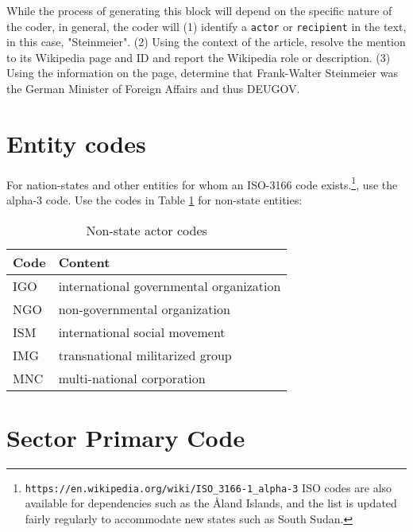\documentclass[11pt]{report}
\newcommand{\txt}[1]{\texttt{#1}}
\newcommand{\fn}[1]{\footnote{#1}}
\begin{document}
While the process of generating this block will depend on the specific nature of the coder, in general, the coder will (1) identify a  \txt{actor} or \txt{recipient} in the text, in this case, "Steinmeier". (2) Using the context of the article, resolve the mention to its Wikipedia page and ID and report the Wikipedia role or description. (3) Using the information on the page, determine that Frank-Walter Steinmeier was the German Minister of Foreign Affairs and thus DEUGOV.


\section{Entity codes}

For nation-states and other entities for whom an ISO-3166 code exists.\fn{\txt{https://en.wikipedia.org/wiki/ISO\_3166-1\_alpha-3} ISO codes are also available for dependencies such as the \AA land Islands, and the list is updated fairly regularly to accommodate new states such as South Sudan.}, use the alpha-3 code. Use the codes in Table \ref{tab:nonstate} for non-state entities:

\begin{table}[htp]
\caption{Non-state actor codes}
\begin{center}
\begin{tabular}{|l|l|}
\hline
Code & Content \\
\hline
IGO   &   international governmental organization\\
NGO &   non-governmental organization\\
ISM           &   international social movement\\
IMG            &   transnational militarized group\\
MNC            &   multi-national corporation\\
\hline
\end{tabular}
\end{center}
\label{tab:nonstate}
\end{table}%

\newpage 

\section{Sector Primary Code}
\end{document}
